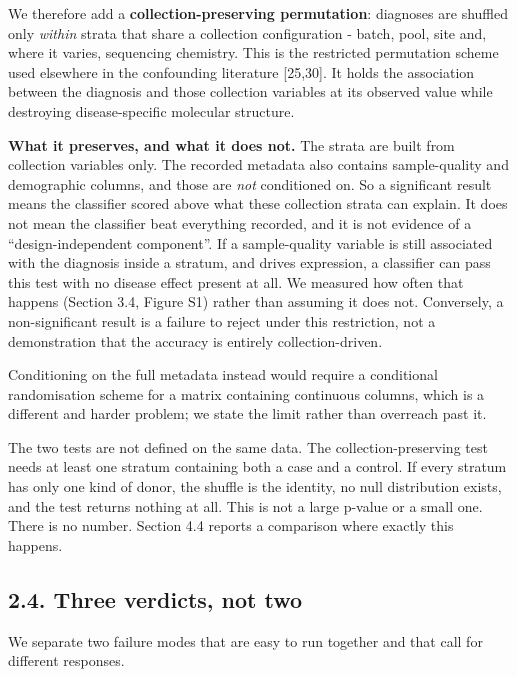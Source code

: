 We therefore add a \textbf{collection-preserving permutation}: diagnoses are shuffled only \emph{within} strata that share a collection configuration - batch, pool, site and, where it varies, sequencing chemistry. This is the restricted permutation scheme used elsewhere in the confounding literature {[}25,30{]}. It holds the association between the diagnosis and those collection variables at its observed value while destroying disease-specific molecular structure.

\textbf{What it preserves, and what it does not.} The strata are built from collection variables only. The recorded metadata also contains sample-quality and demographic columns, and those are \emph{not} conditioned on. So a significant result means the classifier scored above what these collection strata can explain. It does not mean the classifier beat everything recorded, and it is not evidence of a ``design-independent component''. If a sample-quality variable is still associated with the diagnosis inside a stratum, and drives expression, a classifier can pass this test with no disease effect present at all. We measured how often that happens (Section 3.4, Figure S1) rather than assuming it does not. Conversely, a non-significant result is a failure to reject under this restriction, not a demonstration that the accuracy is entirely collection-driven.

Conditioning on the full metadata instead would require a conditional randomisation scheme for a matrix containing continuous columns, which is a different and harder problem; we state the limit rather than overreach past it.

The two tests are not defined on the same data. The collection-preserving test needs at least one stratum containing both a case and a control. If every stratum has only one kind of donor, the shuffle is the identity, no null distribution exists, and the test returns nothing at all. This is not a large p-value or a small one. There is no number. Section 4.4 reports a comparison where exactly this happens.

\subsection{2.4. Three verdicts, not two}\label{three-verdicts-not-two}

We separate two failure modes that are easy to run together and that call for different responses.
